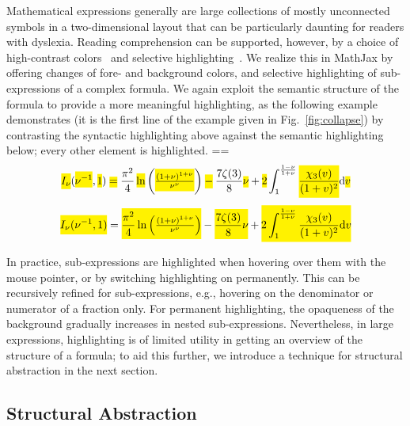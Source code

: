 \documentclass{sig-alternate}
\begin{document}
Mathematical expressions generally are large collections of mostly unconnected
symbols in a two-dimensional layout that can be particularly daunting for
readers with dyslexia.  Reading comprehension can be supported, 
however, by a
choice of high-contrast colors~\cite{rello2012optimal} and selective
highlighting~\cite{jones2008strategies}. We realize this in MathJax by offering
changes of fore- and background colors, and selective highlighting of
sub-expressions of a complex formula. We again exploit the semantic
structure of the formula to provide a more meaningful highlighting, as the
following example demonstrates (it is the first line of the example given in
Fig.~\ref{fig:collapse}) by contrasting the syntactic highlighting above against
the semantic highlighting below; every other element is highlighted.
\def\cb#1{\colorbox{yellow}{\ensuremath{\!\!\displaystyle#1\!\!}}}
{=\baselineskip \small\baselineskip=
\[\cb{I_\nu}
  (
  \cb{\nu^{-1}}
  ,
  \cb{1}
  )
  \mathrel{\cb{=}}
  \frac{\pi^2}{4}
  \mathop{\cb{\ln}}
  \left(
    \cb{\tfrac{(1+\nu)^{1+\nu}}{\nu^\nu}}
  \right)
  \mathbin{\cb{-}}
  \frac{7\zeta(3)}{8}
  \cb{\nu}
  +
  \cb{2}
  \int^\frac{1-\nu}{1+\nu}_1
  \cb{\frac{\chi_3(v)}{(1+v)^2}}
  {\rm d}
  \cb{v}
\]
\[\cb{I_\nu(\nu^{-1},1)}
  =\cb{\frac{\pi^2}{4}\ln\left(\tfrac{(1+\nu)^{1+\nu}}{\nu^\nu}
\right)}-\cb{\frac{7\zeta(3)}{8}\nu}+
\cb{2\int^\frac{1-\nu}{1+\nu}_1\frac{\chi_3(v)}{(1+v)^2}{\rm d}v}
\]
}

\enlargethispage{10pt}
In practice, sub-expressions are highlighted when hovering over them with the
mouse pointer, or by switching highlighting on permanently. This can be
recursively refined for sub-expressions, e.g., hovering on the denominator or
numerator of a fraction only. For permanent highlighting, the opaqueness of the
background gradually increases in nested sub-expressions. Nevertheless, in large
expressions, highlighting is of limited utility in getting an overview of the structure
of a formula; to aid this further, we introduce a technique for
structural abstraction in the next section.

\subsection{Structural Abstraction}
\label{sec:abstraction}
\end{document}
